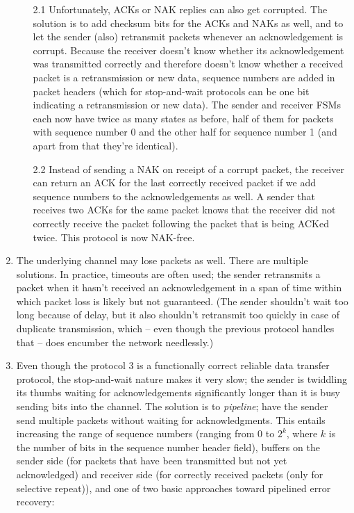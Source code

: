 \documentclass[table, xcdraw]{article}%
\begin{document}
\begin{enumerate}
    \begin{enumerate}
        \item[2.1] Unfortunately, ACKs or NAK replies can also get corrupted. The solution is to add checksum bits for the ACKs and NAKs as well, and to let the sender (also) retransmit packets whenever an acknowledgement is corrupt. Because the receiver doesn't know whether its acknowledgement was transmitted correctly and therefore doesn't know whether a received packet is a retransmission or new data, sequence numbers are added in packet headers (which for stop-and-wait protocols can be one bit indicating a retransmission or new data). The sender and receiver FSMs each now have twice as many states as before, half of them for packets with sequence number 0 and the other half for sequence number 1 (and apart from that they're identical).
        \item[2.2] Instead of sending a NAK on receipt of a corrupt packet, the receiver can return an ACK for the last correctly received packet if we add sequence numbers to the acknowledgements as well. A sender that receives two ACKs for the same packet knows that the receiver did not correctly receive the packet following the packet that is being ACKed twice. This protocol is now NAK-free.
    \end{enumerate}
    
    \item The underlying channel may lose packets as well. There are multiple solutions. In practice, timeouts are often used; the sender retransmits a packet when it hasn't received an acknowledgement in a span of time within which packet loss is likely but not guaranteed. (The sender shouldn't wait too long because of delay, but it also shouldn't retransmit too quickly in case of duplicate transmission, which -- even though the previous protocol handles that -- does encumber the network needlessly.)
    \item Even though the protocol 3 is a functionally correct reliable data transfer protocol, the stop-and-wait nature makes it very slow; the sender is twiddling its thumbs waiting for acknowledgements significantly longer than it is busy sending bits into the channel. The solution is to \emph{pipeline}; have the sender send multiple packets without waiting for acknowledgments. This entails increasing the range of sequence numbers (ranging from $0$ to $2^k$, where $k$ is the number of bits in the sequence number header field), buffers on the sender side (for packets that have been transmitted but not yet acknowledged) and receiver side (for correctly received packets (only for selective repeat)), and one of two basic approaches toward pipelined error recovery:


\end{enumerate}
\end{document}
